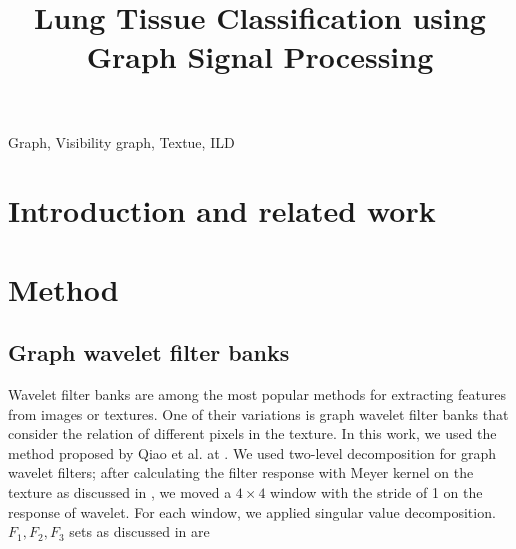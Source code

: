 \documentclass[conference]{IEEEtran}
\begin{document}
\title{Lung Tissue Classification using Graph Signal Processing}
\author{
\and
{}
\and
{}
\and
}

\maketitle

\begin{abstract}
\end{abstract}

\begin{IEEEkeywords}
Graph, Visibility graph, Textue, ILD
\end{IEEEkeywords}

\section{Introduction and related work}
\vspace{0.5cm}




\section{Method}
\subsection{\textbf{Graph wavelet filter banks}}

Wavelet filter banks are among the most popular methods for extracting features from images or textures. One of their variations is graph wavelet filter banks that consider the relation of different pixels in the texture. In this work, we used the method proposed by Qiao et al. at \cite{wavelet}. We used two-level decomposition for graph wavelet filters; after calculating the filter response with Meyer kernel on the texture as discussed in \cite{wavelet}, we moved a $4\times4$ window with the stride of 1 on the response of wavelet. For each window, we applied singular value decomposition. $F_1 , F_2, F_3$ sets as discussed in \cite{wavelet} are
\end{document}
